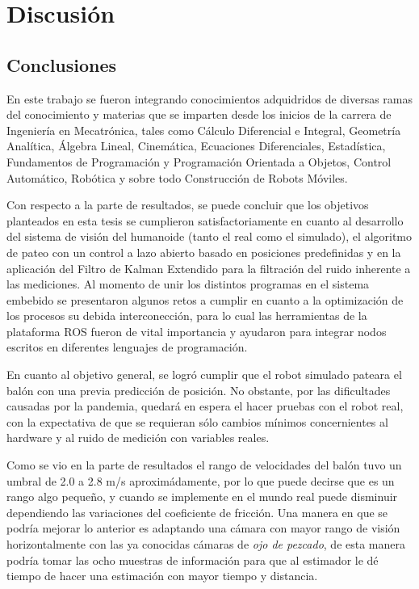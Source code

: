 \chapter{Discusión}
\section{Conclusiones}
	En este trabajo se fueron integrando conocimientos adquidridos de diversas ramas del conocimiento y materias que se imparten desde los inicios de la carrera de Ingeniería en Mecatrónica, tales como Cálculo Diferencial e Integral, Geometría Analítica, Álgebra Lineal, Cinemática, Ecuaciones Diferenciales, Estadística, Fundamentos de Programación y Programación Orientada a Objetos, Control Automático, Robótica y sobre todo Construcción de Robots Móviles.
	
	Con respecto a la parte de resultados, se puede concluir que los objetivos planteados en esta tesis se cumplieron satisfactoriamente en cuanto al desarrollo del sistema de visión del humanoide (tanto el real como el simulado), el algoritmo de pateo con un control a lazo abierto basado en posiciones predefinidas y en la aplicación del Filtro de Kalman Extendido para la filtración del ruido inherente a las mediciones.
	Al momento de unir los distintos programas en el sistema embebido se presentaron algunos retos a cumplir en cuanto a la optimización de los procesos su debida interconección, para lo cual las herramientas de la plataforma ROS fueron de vital importancia y ayudaron para integrar nodos escritos en diferentes lenguajes de programación.

	En cuanto al objetivo general, se logró cumplir que el robot simulado pateara el balón con una previa predicción de posición. No obstante, por las dificultades causadas por la pandemia, quedará en espera el hacer pruebas con el robot real, con la expectativa de que se requieran sólo cambios mínimos concernientes al hardware y al ruido de medición con variables reales.
	
	Como se vio en la parte de resultados el rango de velocidades del balón tuvo un umbral de 2.0 a 2.8 m/s aproximádamente, por lo que puede decirse que es un rango algo pequeño, y cuando se implemente en el mundo real puede disminuir dependiendo las variaciones del coeficiente de fricción. Una manera en que se podría mejorar lo anterior es adaptando una cámara con mayor rango de visión horizontalmente con las ya conocidas cámaras de \textit{ojo de pezcado}, de esta manera podría tomar las ocho muestras de información para que al estimador le dé tiempo de hacer una estimación con mayor tiempo y distancia.
	
